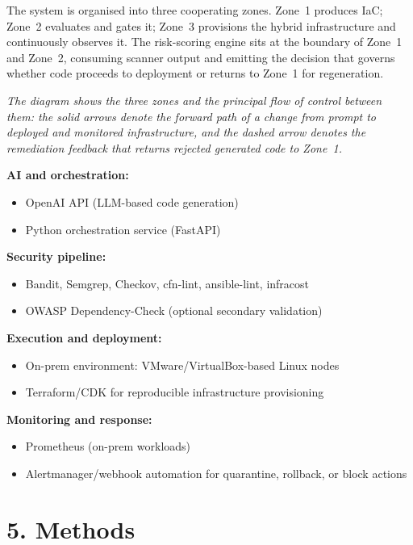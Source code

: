The system is organised into three cooperating zones. Zone~1 produces IaC; Zone~2 evaluates and
gates it; Zone~3 provisions the hybrid infrastructure and continuously observes it. The
risk-scoring engine sits at the boundary of Zone~1 and Zone~2, consuming scanner output and emitting
the decision that governs whether code proceeds to deployment or returns to Zone~1 for
regeneration.



\bigskip
\noindent\textit{The diagram shows the three zones and the principal flow of control between
them: the solid arrows denote the forward path of a change from prompt to deployed and monitored
infrastructure, and the dashed arrow denotes the remediation feedback that returns rejected
generated code to Zone~1.}

\bigskip
\noindent\textbf{AI and orchestration:}
\begin{itemize}
    \item OpenAI API (LLM-based code generation)
    \item Python orchestration service (FastAPI)
\end{itemize}

\noindent\textbf{Security pipeline:}
\begin{itemize}
    \item Bandit, Semgrep, Checkov, cfn-lint, ansible-lint, infracost
    \item OWASP Dependency-Check (optional secondary validation)
\end{itemize}

\noindent\textbf{Execution and deployment:}
\begin{itemize}
    \item On-prem environment: VMware/VirtualBox-based Linux nodes
    \item Terraform/CDK for reproducible infrastructure provisioning
\end{itemize}

\noindent\textbf{Monitoring and response:}
\begin{itemize}
    \item Prometheus (on-prem workloads)
    \item Alertmanager/webhook automation for quarantine, rollback, or block actions
\end{itemize}

\section*{5. Methods}

